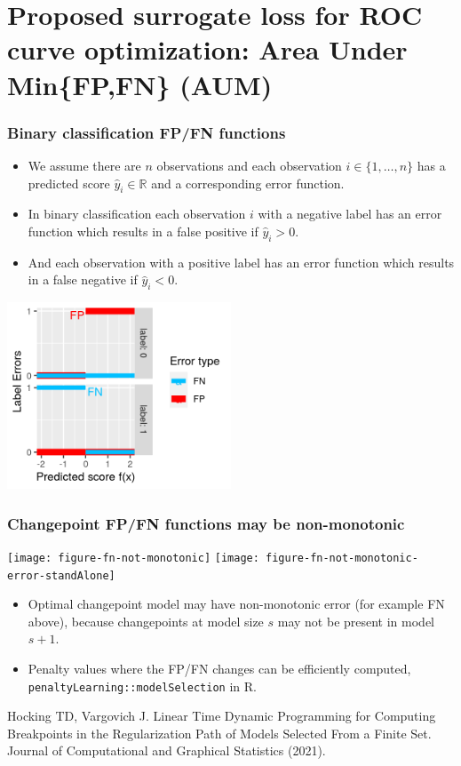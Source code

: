 \documentclass[t]{beamer}
\begin{document}
\section{Proposed surrogate loss for ROC curve optimization: Area Under Min\{FP,FN\} (AUM)} 

\begin{frame}
  \frametitle{Binary classification FP/FN functions}

  \begin{itemize}
  \item We assume there are $n$ observations and each observation
    $i\in\{1,\dots,n\}$ has a predicted score $\hat y_i\in\mathbb R$ and a corresponding error function.
  \item In binary classification each observation $i$ with a negative
    label has an error function which results in a false positive if
    $\hat y_i>0$.
  \item And each observation with a positive
    label has an error function which results in a false negative if
    $\hat y_i<0$.
  \end{itemize}

\includegraphics[width=0.5\textwidth]{figure-more-than-one-binary-errors}  

\end{frame}


\begin{frame}
  \frametitle{Changepoint FP/FN functions may be non-monotonic}

  \texttt{[image: figure-fn-not-monotonic]}
  \texttt{[image: figure-fn-not-monotonic-error-standAlone]}

\vspace{-0.1cm}

\begin{itemize}
\item Optimal changepoint model may have non-monotonic error (for example
  FN above), because changepoints at model size $s$ may not be present in
  model $s+1$.
\item Penalty values where the FP/FN changes can be efficiently
  computed, \texttt{penaltyLearning::modelSelection} in R.
\end{itemize}
{\scriptsize Hocking TD, Vargovich J. Linear Time Dynamic Programming
  for Computing Breakpoints in the Regularization Path of Models
  Selected From a Finite Set. Journal of Computational and Graphical
  Statistics (2021).}
\end{frame}
\end{document}

